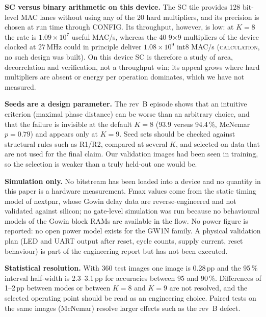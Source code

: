 \documentclass[conference]{IEEEtran}
\newcommand{\lbl}[1]{\textsc{#1}}    %
\begin{document}
\textbf{SC versus binary arithmetic on this device.} The SC tile provides 128
bit-level MAC lanes without using any of the 20 hard multipliers, and its
precision is chosen at run time through CONFIG. Its throughput, however, is
low: at $K=8$ the rate is $1.09\times10^7$ useful MAC/s, whereas the
40 9$\times$9 multipliers of the device clocked at 27\,MHz could in principle
deliver $1.08\times10^9$ int8 MAC/s (\lbl{calculation}, no such design was
built). On this device SC is therefore a study of area, decorrelation and
verification, not a throughput win; its appeal grows where hard multipliers
are absent or energy per operation dominates, which we have not measured.

\textbf{Seeds are a design parameter.} The rev~B episode shows that an
intuitive criterion (maximal phase distance) can be worse than an arbitrary
choice, and that the failure is invisible at the default $K=8$ (93.9 versus
94.4\,\%, McNemar $p=0.79$) and appears only at $K=9$. Seed sets should be
checked against structural rules such as R1/R2, compared at several $K$, and
selected on data that are not used for the final claim. Our validation images
had been seen in training, so the selection is weaker than a truly held-out
one would be.

\textbf{Simulation only.} No bitstream has been loaded into a device and no
quantity in this paper is a hardware measurement. Fmax values come from the
static timing model of nextpnr, whose Gowin delay data are reverse-engineered
and not validated against silicon; no gate-level simulation was run because
no behavioural models of the Gowin block RAMs are available in the flow. No
power figure is reported: no open power model exists for the GW1N family. A
physical validation plan (LED and UART output after reset, cycle counts,
supply current, reset behaviour) is part of the engineering report but has
not been executed.

\textbf{Statistical resolution.} With 360 test images one image is 0.28\,pp
and the 95\,\% interval half-width is 2.3--3.1\,pp for accuracies between 95
and 90\,\%. Differences of 1--2\,pp between modes or between $K=8$ and $K=9$
are not resolved, and the selected operating point should be read as an
engineering choice. Paired tests on the same images (McNemar) resolve larger
effects such as the rev~B defect.
\end{document}
